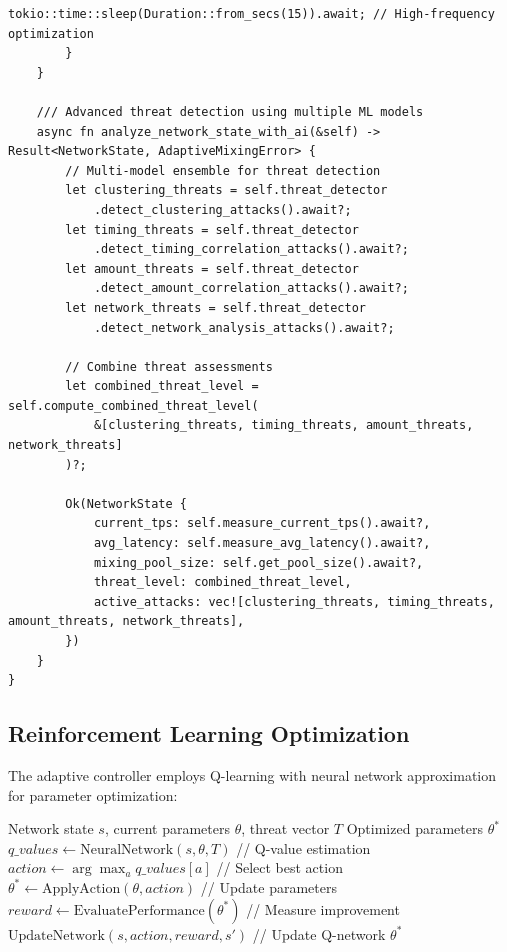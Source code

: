 \documentclass[12pt,a4paper]{article}
\begin{document}
\begin{lstlisting}[style=rustcode, caption=Adaptive AI/ML Mixing Controller]
            tokio::time::sleep(Duration::from_secs(15)).await; // High-frequency optimization
        }
    }
    
    /// Advanced threat detection using multiple ML models
    async fn analyze_network_state_with_ai(&self) -> Result<NetworkState, AdaptiveMixingError> {
        // Multi-model ensemble for threat detection
        let clustering_threats = self.threat_detector
            .detect_clustering_attacks().await?;
        let timing_threats = self.threat_detector
            .detect_timing_correlation_attacks().await?;
        let amount_threats = self.threat_detector
            .detect_amount_correlation_attacks().await?;
        let network_threats = self.threat_detector
            .detect_network_analysis_attacks().await?;
        
        // Combine threat assessments
        let combined_threat_level = self.compute_combined_threat_level(
            &[clustering_threats, timing_threats, amount_threats, network_threats]
        )?;
        
        Ok(NetworkState {
            current_tps: self.measure_current_tps().await?,
            avg_latency: self.measure_avg_latency().await?,
            mixing_pool_size: self.get_pool_size().await?,
            threat_level: combined_threat_level,
            active_attacks: vec![clustering_threats, timing_threats, amount_threats, network_threats],
        })
    }
}
\end{lstlisting}

\subsection{Reinforcement Learning Optimization}

The adaptive controller employs Q-learning with neural network approximation for parameter optimization:

\begin{algorithm}
\caption{RL-Based Parameter Optimization}
\begin{algorithmic}[1]
\REQUIRE Network state $s$, current parameters $\theta$, threat vector $T$
\ENSURE Optimized parameters $\theta^*$
\STATE $q\_values \leftarrow \text{NeuralNetwork}(s, \theta, T)$ // Q-value estimation
\STATE $action \leftarrow \arg\max_{a} q\_values[a]$ // Select best action
\STATE $\theta^* \leftarrow \text{ApplyAction}(\theta, action)$ // Update parameters
\STATE $reward \leftarrow \text{EvaluatePerformance}(\theta^*)$ // Measure improvement
\STATE $\text{UpdateNetwork}(s, action, reward, s')$ // Update Q-network
\RETURN $\theta^*$
\end{algorithmic}
\end{algorithm}
\end{document}

